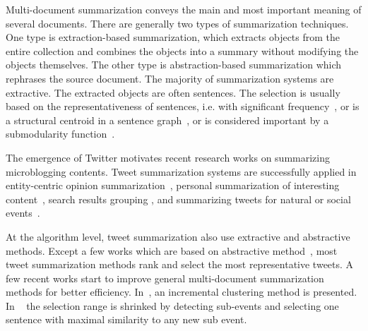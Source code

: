 \documentclass[envcountsame]{llncs}
\begin{document}
Multi-document summarization conveys the main and most important meaning of several documents. There are generally two types of summarization techniques. One type is extraction-based summarization, which extracts objects from the entire collection and combines the objects into a summary without modifying the objects themselves. The other type is abstraction-based summarization which rephrases the source document. The majority of summarization systems are extractive. The extracted objects are often sentences. The selection is usually based on the representativeness of sentences, i.e. with significant frequency~\cite{Yih2007Multi-document}, or is a structural centroid in a sentence graph~\cite{Lin2012Generating}, or is considered important by a submodularity function~\cite{MSSF}.



The emergence of Twitter motivates recent research works on summarizing microblogging contents. Tweet summarization systems are successfully applied in entity-centric opinion summarization~\cite{Meng2012Entitycentric}, personal summarization of interesting content~\cite{Ren2013Personalized,Chin2017TOTEM}, search results grouping \cite{Mathioudakis2010TwitterMonitor}, and summarizing tweets for natural or social events~\cite{Takamura2011Summarizing,Lin2012Generating,Rudra2015Extracting,Shou2013Sumblr,Liu2016LEDS,Gillani2017Post,Zubiaga2012Towards}.

At the algorithm level, tweet summarization also use extractive and abstractive methods. Except a few works which are based on abstractive method~\cite{Sharifi2010Summarizing}, most tweet summarization methods rank and select the most representative tweets. A few recent works start to improve general multi-document summarization methods for better efficiency. In~\cite{Shou2013Sumblr}, an incremental clustering method is presented. In ~\cite{Zubiaga2012Towards} the selection range is shrinked by detecting sub-events and selecting one sentence with maximal similarity to any new sub event.
\end{document}
